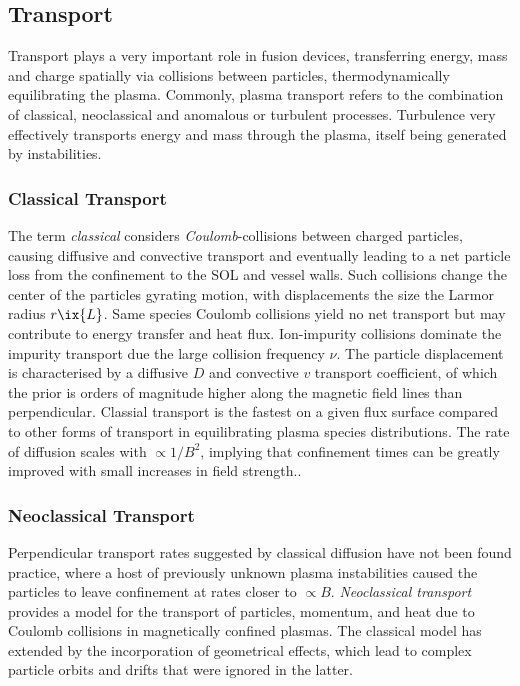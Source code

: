         \subsection{Transport}\label{subsec:tranport}%
%
            Transport plays a very important role in fusion devices, transferring energy, mass and charge spatially via collisions between particles, thermodynamically equilibrating the plasma. Commonly, plasma transport refers to the combination of classical, neoclassical and anomalous or turbulent processes. Turbulence very effectively transports energy and mass through the plasma, itself being generated by instabilities.%
%
            \subsubsection*{Classical Transport}%
%
                The term \textit{classical} considers \textit{Coulomb}-collisions between charged particles, causing diffusive and convective transport and eventually leading to a net particle loss from the confinement to the SOL and vessel walls. Such collisions change the center of the particles gyrating motion, with displacements the size the Larmor radius $r\ix{L}$. Same species Coulomb collisions yield no net transport but may contribute to energy transfer and heat flux. Ion-impurity collisions dominate the impurity transport due the large collision frequency $\nu$. The particle displacement is characterised by a diffusive $D$ and convective $v$ transport coefficient, of which the prior is orders of magnitude higher along the magnetic field lines than perpendicular. Classial transport is the fastest on a given flux surface compared to other forms of transport in equilibrating plasma species distributions. The rate of diffusion scales with $\propto1/B^{2}$, implying that confinement times can be greatly improved with small increases in field strength.\cite{Chen1984}.
%
            \subsubsection*{Neoclassical Transport}%
%
                Perpendicular transport rates suggested by classical diffusion have not been found practice, where a host of previously unknown plasma instabilities caused the particles to leave confinement at rates closer to $\propto B$. \textit{Neoclassical transport} provides a model for the transport of particles, momentum, and heat due to Coulomb collisions in magnetically confined plasmas. The classical model has extended by the incorporation of geometrical effects, which lead to complex particle orbits and drifts that were ignored in the latter.\\


